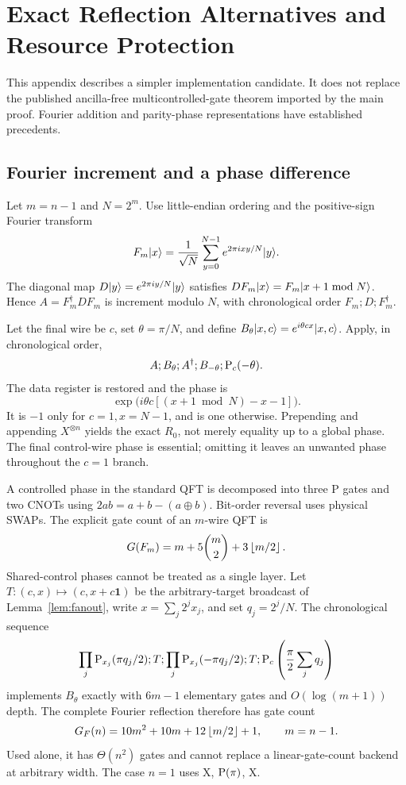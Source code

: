 \section{Exact Reflection Alternatives and Resource Protection}\label{app:reflection}
This appendix describes a simpler implementation candidate. It does not replace the published ancilla-free multicontrolled-gate theorem imported by the main proof. Fourier addition and parity-phase representations have established precedents\cite{draper2000,welch2014}.

\subsection{Fourier increment and a phase difference}
Let $m=n-1$ and $N=2^m$. Use little-endian ordering and the positive-sign Fourier transform
\[
F_m\lvert x\rangle=\frac1{\sqrt N}\sum_{y=0}^{N-1}e^{2\pi ixy/N}\lvert y\rangle.
\]
The diagonal map $D\lvert y\rangle=e^{2\pi iy/N}\lvert y\rangle$ satisfies $DF_m\lvert x\rangle=F_m\lvert x+1\bmod N\rangle$. Hence $A=F_m^\dagger DF_m$ is increment modulo $N$, with chronological order $F_m;D;F_m^\dagger$.

Let the final wire be $c$, set $\theta=\pi/N$, and define $B_\theta\lvert x,c\rangle=e^{i\theta cx}\lvert x,c\rangle$. Apply, in chronological order,
\[
A;B_\theta;A^\dagger;B_{-\theta};\mathrm{P}_c(-\theta).
\]
The data register is restored and the phase is
\[
\exp\bigl(i\theta c[(x+1\bmod N)-x-1]\bigr).
\]
It is $-1$ only for $c=1,x=N-1$, and is one otherwise. Prepending and appending $X^{\otimes n}$ yields the exact $R_0$, not merely equality up to a global phase. The final control-wire phase is essential; omitting it leaves an unwanted phase throughout the $c=1$ branch.

A controlled phase in the standard QFT is decomposed into three P gates and two CNOTs using $2ab=a+b-(a\oplus b)$. Bit-order reversal uses physical SWAPs. The explicit gate count of an $m$-wire QFT is
\[
G(F_m)=m+5\binom m2+3\left\lfloor m/2\right\rfloor.
\]
Shared-control phases cannot be treated as a single layer. Let $T:(c,x)\mapsto(c,x+c\mathbf1)$ be the arbitrary-target broadcast of Lemma~\ref{lem:fanout}, write $x=\sum_j2^jx_j$, and set $q_j=2^j/N$. The chronological sequence
\[
\prod_j\mathrm{P}_{x_j}(\pi q_j/2);T;
\prod_j\mathrm{P}_{x_j}(-\pi q_j/2);T;
\mathrm{P}_c\left(\frac\pi2\sum_jq_j\right)
\]
implements $B_\theta$ exactly with $6m-1$ elementary gates and $O(\log(m+1))$ depth. The complete Fourier reflection therefore has gate count
\begin{equation}\label{eq:fouriergates}
G_F(n)=10m^2+10m+12\left\lfloor m/2\right\rfloor+1,\qquad m=n-1.
\end{equation}
Used alone, it has $\Theta(n^2)$ gates and cannot replace a linear-gate-count backend at arbitrary width. The case $n=1$ uses X, $\mathrm{P}(\pi)$, X.

